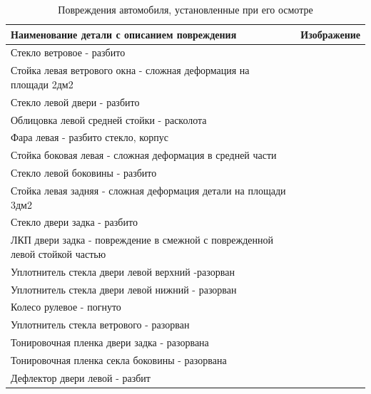 \begin{longtable}{|M{125mm}|M{30mm}|}
\caption[]{\footnotesize {Повреждения автомобиля, установленные при его осмотре}} \label{tab:5}\\ \hline
\bf {\small Наименование  детали с описанием повреждения} & \bf {\small Изображение} \\ \hline \endhead
%
%
{\small Стекло ветровое - разбито   } &  \\ \hline  %
{\small Стойка левая ветрового окна - сложная деформация на площади 2дм2  } &  \\ \hline 
{\small Стекло левой двери - разбито  } &  \\ \hline
{\small Облицовка левой средней стойки - расколота }&  \\ \hline 
{\small Фара левая - разбито стекло, корпус   } &  \\ \hline
{\small Стойка боковая левая - сложная деформация в средней части  } &  \\ \hline
{\small Стекло левой боковины - разбито   } &  \\ \hline
{\small Стойка левая задняя - сложная деформация детали на площади 3дм2   } &  \\ \hline
{\small Стекло двери задка - разбито  } &  \\ \hline
{\small ЛКП двери задка - повреждение в смежной с поврежденной левой стойкой частью   } &  \\ \hline
{\small Уплотнитель стекла двери левой верхний -разорван  } &  \\ \hline
{\small Уплотнитель стекла двери левой нижний - разорван  } &  \\ \hline
{\small Колесо рулевое - погнуто  } &  \\ \hline
{\small Уплотнитель стекла ветрового - разорван  } &  \\ \hline
{\small Тонировочная пленка двери задка - разорвана  } &  \\ \hline
{\small Тонировочная пленка секла боковины - разорвана } &  \\ \hline
{\small Дефлектор двери левой - разбит  } &  \\ \hline
\end{longtable}

